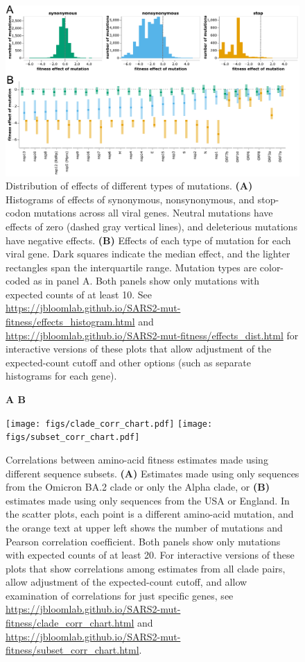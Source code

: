 \documentclass[9pt,twocolumn,twoside]{gsajnl_modified}
\begin{document}
\begin{figure}
\includegraphics[width=\linewidth]{figs/fig2.pdf}
\caption{
Distribution of effects of different types of mutations.
{\bf (A)}
Histograms of effects of synonymous, nonsynonymous, and stop-codon mutations across all viral genes.
Neutral mutations have effects of zero (dashed gray vertical lines), and deleterious mutations have negative effects.
{\bf (B)}
Effects of each type of mutation for each viral gene.
Dark squares indicate the median effect, and the lighter rectangles span the interquartile range.
Mutation types are color-coded as in panel A.
Both panels show only mutations with expected counts of at least 10.
See \url{https://jbloomlab.github.io/SARS2-mut-fitness/effects_histogram.html} and \url{https://jbloomlab.github.io/SARS2-mut-fitness/effects_dist.html} for interactive versions of these plots that allow adjustment of the expected-count cutoff and other options (such as separate histograms for each gene).
\label{fig:effects_dist}
}
\end{figure}

\begin{figure}
\centering
{\bf \Large A \hspace{0.32\linewidth} B \hspace{0.32\linewidth}}

\texttt{[image: figs/clade\_corr\_chart.pdf]}
\hspace{0.05\linewidth}
\texttt{[image: figs/subset\_corr\_chart.pdf]}
\caption{
Correlations between amino-acid fitness estimates made using different sequence subsets.
{\bf (A)} Estimates made using only sequences from the Omicron BA.2 clade or only the Alpha clade, or {\bf (B)} estimates made using only sequences from the USA or England.
In the scatter plots, each point is a different amino-acid mutation, and the orange text at upper left shows the number of mutations and Pearson correlation coefficient.
Both panels show only mutations with expected counts of at least 20.
For interactive versions of these plots that show correlations among estimates from all clade pairs, allow adjustment of the expected-count cutoff, and allow examination of correlations for just specific genes, see \url{https://jbloomlab.github.io/SARS2-mut-fitness/clade_corr_chart.html} and \url{https://jbloomlab.github.io/SARS2-mut-fitness/subset_corr_chart.html}.
\label{fig:corr}
}
\end{figure}
\end{document}
